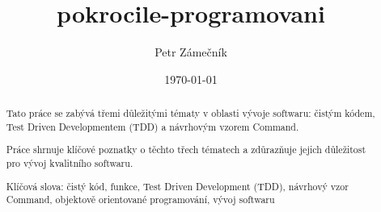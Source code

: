 \documentclass{article}
\title{pokrocile-programovani}
\author{Petr Zámečník}
\date{\today}
\begin{document}
    \maketitle

    \begin{abstract}
        Tato práce se zabývá třemi důležitými tématy v oblasti vývoje softwaru: čistým kódem, Test Driven Developmentem (TDD) a návrhovým vzorem Command.

        Práce shrnuje klíčové poznatky o těchto třech tématech a zdůrazňuje jejich důležitost pro vývoj kvalitního softwaru.

        Klíčová slova: čistý kód, funkce, Test Driven Development (TDD), návrhový vzor Command, objektově orientované programování, vývoj softwaru
    \end{abstract}
\end{document}

